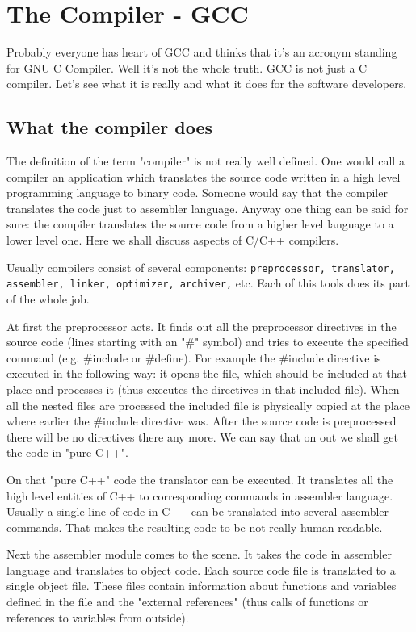 
\section{The Compiler - GCC}
\label{gcc}
Probably everyone has heart of GCC and thinks that it's an acronym standing for GNU C Compiler. Well it's not the whole truth. GCC is not just a C compiler. Let's see what it is really and what it does for the software developers.

\subsection{What the compiler does}
The definition of the term "compiler" is not really well defined. One would call a compiler an application which translates the source code written in a high level programming language to binary code. Someone would say that the compiler translates the code just to assembler language. Anyway one thing can be said for sure: the compiler translates the source code from a higher level language to a lower level one. Here we shall discuss aspects of C/C++ compilers.

Usually compilers consist of several components: {\tt preprocessor, translator, assembler, linker, optimizer, archiver,} etc. Each of this tools does its part of the whole job. 

At first the preprocessor acts. It finds out all the preprocessor directives in the source code (lines starting with an "\#" symbol) and tries to execute the specified command (e.g. \#include or \#define). For example the \#include directive is executed in the following way: it opens the file, which should be included at that place and processes it (thus executes the directives in that included file). When all the nested files are processed the included file is physically copied at the place where earlier the \#include directive was. After the source code is preprocessed there will be no directives there any more. We can say that on out we shall get the code in "pure C++". 

On that "pure C++" code the translator can be executed. It translates all the high level entities of C++ to corresponding commands in assembler language. Usually a single line of code in C++ can be translated into several assembler commands. That makes the resulting code to be not really human-readable.

Next the assembler module comes to the scene. It takes the code in assembler language and translates to object code. Each source code file is translated to a single object file. These files contain information about functions and variables defined in the file and the "external references" (thus calls of functions or references to variables from outside).

